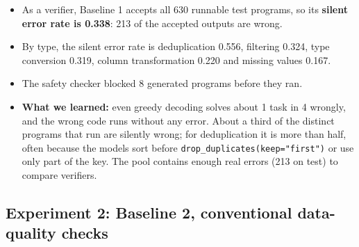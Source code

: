 \documentclass[11pt]{article}
\providecommand{\tightlist}{\setlength{\itemsep}{0pt}\setlength{\parskip}{0pt}}
\begin{document}
\begin{itemize}
\tightlist
\item
  As a verifier, Baseline 1 accepts all 630 runnable test programs, so
  its \textbf{silent error rate is 0.338}: 213 of the accepted outputs
  are wrong.
\item
  By type, the silent error rate is deduplication 0.556, filtering
  0.324, type conversion 0.319, column transformation 0.220 and missing
  values 0.167.
\item
  The safety checker blocked 8 generated programs before they ran.
\item
  \textbf{What we learned:} even greedy decoding solves about 1 task in
  4 wrongly, and the wrong code runs without any error. About a third of
  the distinct programs that run are silently wrong; for deduplication
  it is more than half, often because the models sort before
  \texttt{drop\_\allowbreak{}duplicates(keep="first")} or use only part
  of the key. The pool contains enough real errors (213 on test) to
  compare verifiers.
\end{itemize}

\subsection{Experiment 2: Baseline 2, conventional data-quality checks}
\end{document}
